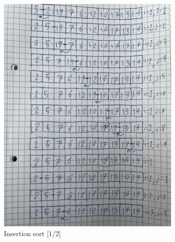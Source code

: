 \documentclass[a4paper,12pt]{article}
\begin{document}
\begin{figure}[H] 
    \centering
    \includegraphics[width=0.8\textwidth]{IMG_2074.jpg}
    \caption{Insertion sort [1/2]}
\end{figure}
\end{document}
